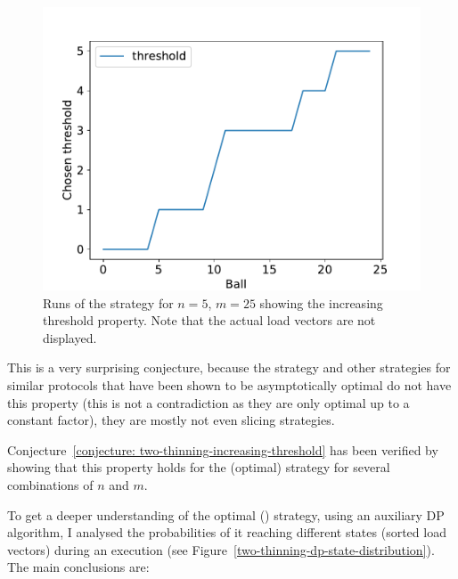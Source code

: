 \begin{figure}
\begin{minipage}[t]{.32\linewidth}
\end{minipage}\hfill
\begin{minipage}[t]{.32\linewidth}
  \centering
  \includegraphics[scale=0.36]{Chapter4/Figs/dp_increasing_threshold_3.pdf}
\end{minipage}
\caption{Runs of the \DP strategy for $n=5$, $m=25$ showing the increasing threshold property. Note that the actual load vectors are not displayed.}
\label{dp-increasing-threshold}
\end{figure}



This is a very surprising conjecture, because the \Threshold strategy and other strategies for similar protocols that have been shown to be asymptotically optimal do not have this property (this is not a contradiction as they are only optimal up to a constant factor), they are mostly not even slicing strategies.


\begin{remark}
Conjecture~\ref{conjecture: two-thinning-increasing-threshold} has been verified by showing that this property holds for the (optimal) \DP strategy for several combinations of $n$ and $m$. 
\end{remark}


To get a deeper understanding of the optimal (\DP) strategy, using an auxiliary DP algorithm, I analysed the probabilities of it reaching different states (sorted load vectors) during an execution (see Figure~\ref{two-thinning-dp-state-distribution}). The main conclusions are:

